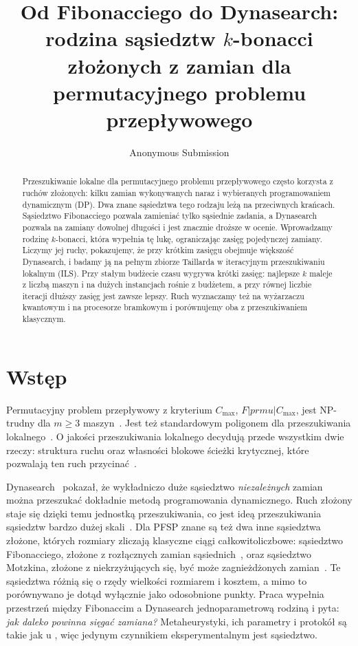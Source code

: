 \documentclass[letterpaper]{article} %
\title{Od Fibonacciego do Dynasearch: rodzina sąsiedztw $k$-bonacci\\
złożonych z zamian dla permutacyjnego problemu przepływowego}
\author{Anonymous Submission}
\theoremstyle{definition}
\begin{document}
\maketitle

\begin{abstract}
Przeszukiwanie lokalne dla permutacyjnego problemu przepływowego często
korzysta z ruchów złożonych: kilku zamian wykonywanych naraz i wybieranych
programowaniem dynamicznym (DP). Dwa znane sąsiedztwa tego rodzaju leżą na
przeciwnych krańcach. Sąsiedztwo Fibonacciego pozwala zamieniać tylko
sąsiednie zadania, a Dynasearch pozwala na zamiany dowolnej długości
i jest znacznie droższe w ocenie. Wprowadzamy rodzinę $k$-bonacci, która
wypełnia tę lukę, ograniczając zasięg pojedynczej zamiany. Liczymy jej
ruchy, pokazujemy, że przy krótkim zasięgu obejmuje większość Dynasearch,
i badamy ją na pełnym zbiorze Taillarda w iteracyjnym przeszukiwaniu
lokalnym (ILS). Przy stałym budżecie czasu wygrywa krótki zasięg: najlepsze $k$
maleje z liczbą maszyn i na dużych instancjach rośnie z budżetem, a przy równej liczbie
iteracji dłuższy zasięg jest zawsze lepszy. Ruch wyznaczamy też na
wyżarzaczu kwantowym i na procesorze bramkowym i porównujemy oba
z przeszukiwaniem klasycznym.
\end{abstract}

\section{Wstęp}
Permutacyjny problem przepływowy z kryterium $C_{\max}$,
$F|prmu|C_{\max}$, jest NP-trudny dla $m\geq 3$ maszyn~\cite{garey1976}. Jest też standardowym poligonem dla przeszukiwania lokalnego~\cite{taillard1993,ruizmaroto2005,ruiz2007,wodecki2002parallel}.
O jakości przeszukiwania lokalnego decydują przede wszystkim dwie rzeczy:
struktura ruchu oraz własności blokowe ścieżki krytycznej, które pozwalają
ten ruch przycinać~\cite{nowicki1996,grabowski2004}.

Dynasearch~\cite{congram2002} pokazał, że wykładniczo duże sąsiedztwo
\emph{niezależnych} zamian można przeszukać dokładnie metodą programowania
dynamicznego. Ruch złożony staje się dzięki temu jednostką przeszukiwania, co jest ideą przeszukiwania sąsiedztw bardzo dużej skali~\cite{ahuja2002survey}. Dla PFSP znane są też dwa inne sąsiedztwa złożone, których rozmiary zliczają klasyczne ciągi całkowitoliczbowe: sąsiedztwo Fibonacciego, złożone z rozłącznych zamian sąsiednich~\cite{wojewodzki2026icaisc,bozejko2026new}, oraz sąsiedztwo Motzkina, złożone z niekrzyżujących się, być może zagnieżdżonych zamian~\cite{wojewodzki2026soco}. Te sąsiedztwa różnią się
o rzędy wielkości rozmiarem i kosztem, a mimo to porównywano je dotąd
wyłącznie jako odosobnione punkty. Praca wypełnia przestrzeń między
Fibonaccim a Dynasearch jednoparametrową rodziną i pyta: \emph{jak daleko
powinna sięgać zamiana?} Metaheurystyki, ich parametry i protokół są takie jak u \citet{wojewodzki2026icaisc,wojewodzki2026soco,wojewodzki2026windowed},
więc jedynym czynnikiem eksperymentalnym jest sąsiedztwo.
\end{document}
